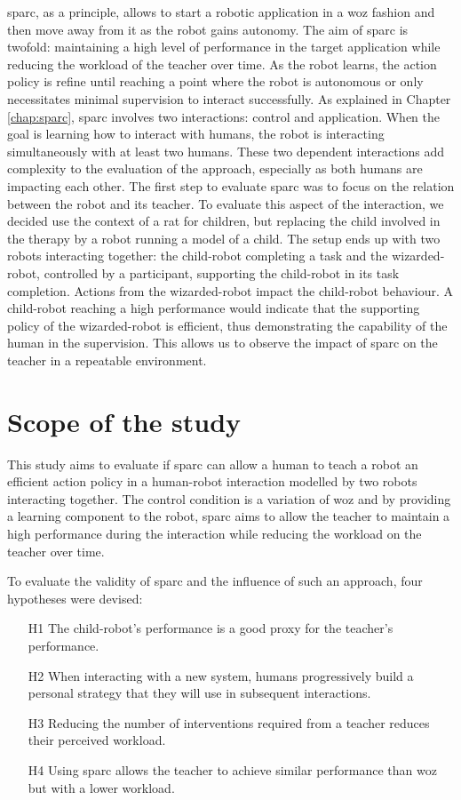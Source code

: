 \gls{sparc}, as a principle, allows to start a robotic application in a \gls{woz} fashion and then move away from it as the robot gains autonomy. The aim of \gls{sparc} is twofold: maintaining a high level of performance in the target application while reducing the workload of the teacher over time. As the robot learns, the action policy is refine until reaching a point where the robot is autonomous or only necessitates minimal supervision to interact successfully. As explained in Chapter \ref{chap:sparc}, \gls{sparc} involves two interactions: control and application. When the goal is learning how to interact with humans, the robot is interacting simultaneously with at least two humans. These two dependent interactions add complexity to the evaluation of the approach, especially as both humans are impacting each other. The first step to evaluate \gls{sparc} was to focus on the relation between the robot and its teacher. To evaluate this aspect of the interaction, we decided use the context of a \gls{rat} for children, but replacing the child involved in the therapy by a robot running a model of a child. The setup ends up with two robots interacting together: the child-robot completing a task and the wizarded-robot, controlled by a participant, supporting the child-robot in its task completion. Actions from the wizarded-robot impact the child-robot behaviour. A child-robot reaching a high performance would indicate that the supporting policy of the wizarded-robot is efficient, thus demonstrating the capability of the human in the supervision. This allows us to observe the impact of \gls{sparc} on the teacher in a repeatable environment. 

\section{Scope of the study}

This study aims to evaluate if \gls{sparc} can allow a human to teach a robot an efficient action policy in a human-robot interaction modelled by two robots interacting together. The control condition is a variation of \gls{woz} and by providing a learning component to the robot, \gls{sparc} aims to allow the teacher to maintain a high performance during the interaction while reducing the workload on the teacher over time.

To evaluate the validity of \gls{sparc} and the influence of such an approach, four hypotheses were devised:
\begin{enumerate}
	\item [H1] The child-robot's performance is a good proxy for the teacher's performance.
	\item [H2] When interacting with a new system, humans progressively build a personal strategy that they will use in subsequent interactions.
	\item [H3] Reducing the number of interventions required from a teacher reduces their perceived workload.
	\item [H4] Using \gls{sparc} allows the teacher to achieve similar performance than \gls{woz} but with a lower workload.
\end{enumerate}

